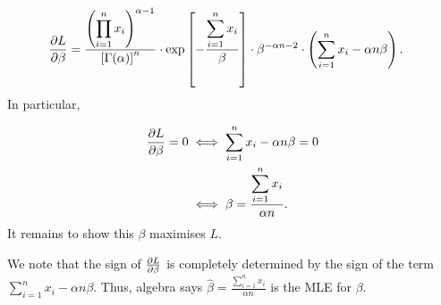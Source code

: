 \documentclass[12pt,letterpaper,reqno]{amsart}
\numberwithin{equation}{subsection}
\begin{document}
\begin{align*}
    \frac{\partial {L}}{\partial {\beta}} &= \frac{\displaystyle \left( \prod_{i=1}^n x_i \right)^{\alpha - 1}}{\left[{\Gamma}\! \left( {\alpha} \right) \right]^n} \cdot  \exp \left[- \frac{\displaystyle \sum_{i=1}^n x_i}{\beta} \right] \cdot \beta^{-\alpha n-2} \cdot \left( \sum_{i=1}^n x_i - \alpha n \beta \right).
\end{align*}
In particular,

\begin{align*}
    \frac{\partial {L}}{\partial {\beta}} = 0 &\iff \sum_{i=1}^n x_i - \alpha n \beta = 0 \\
    &\iff \beta = \frac{\displaystyle \sum_{i=1}^n x_i}{\alpha n}.
\end{align*}
It remains to show this $\beta$ maximises $L$.

We note that the sign of $\frac{\partial {L}}{\partial {\beta}}$ is completely determined by the sign of the term $\sum_{i=1}^n x_i - \alpha n \beta$. Thus, algebra says $\hat{\beta} = \frac{\displaystyle \sum_{i=1}^n x_i}{\alpha n}$ is the MLE for $\beta$.

\newpage
\nocite{*}
\printbibliography
\end{document}
